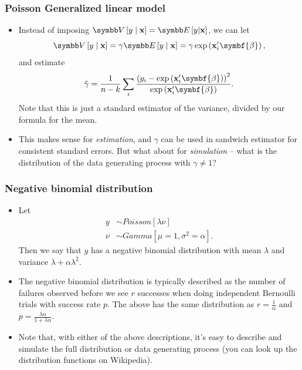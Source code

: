 \documentclass[aspectratio=169,11pt]{beamer}
\begin{document}
\begin{frame}
\frametitle{Poisson Generalized linear model} 
\begin{itemize}
	\item Instead of imposing $\Var\left[y \mid {\bf x}\right] = \E\left[y | {\bf x}\right]$, we can let \[
		\Var\left[y \mid {\bf x}\right] =  \gamma \E\left[y \mid {\bf x}\right] = \gamma\exp\left( {\bf x}_{i}'\symbf{\beta} \right),
	\]
	and estimate\[
	\hat{\gamma} = \frac{1}{n-k} \sum_i \frac{\left(y_i - \exp\left( {\bf x}_{i}'\symbf{\beta} \right)\right)^2}{\exp\left( {\bf x}_{i}'\symbf{\beta} \right)}.
	\]
	Note that this is just a standard estimator of the variance, divided by our formula for the mean.

	\item This makes sense for \emph{estimation}, and $\gamma$ can be used in sandwich estimator for consistent standard errors.
			But what about for \emph{simulation} -- what is the distribution of the data generating process with $\gamma \ne 1$?
			

\end{itemize}
\end{frame}








\begin{frame}
\frametitle{Negative binomial distribution}
\begin{itemize}
\item  Let
\begin{align*}
	y & \sim Poisson\left[\lambda \nu \right] \\
	\nu & \sim Gamma\left[\mu = 1, \sigma^2 =\alpha \right].
\end{align*}
	Then we say that $y$ has a negative binomial distribution with mean $\lambda$ and variance $\lambda +\alpha \lambda^2$.

	\item The negative binomial distribution is typically described as the number of failures observed before
			we see $r$ successes when doing independent Bernoulli trials with success rate $p$. The above has the same distribution
			as $r=\frac{1}{\alpha}$ and $p = \frac{\lambda \alpha}{1+\lambda \alpha}$. 

	\item Note that, with either of the above descriptions, it's easy to describe and simulate the full distribution or data generating process (you can
look up the distribution functions on Wikipedia).



\end{itemize}
\end{frame}
\end{document}
